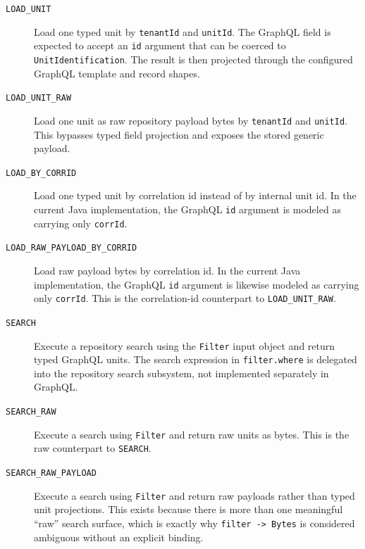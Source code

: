 \begin{description}
\item[\texttt{LOAD\_UNIT}] Load one typed unit by \texttt{tenantId} and \texttt{unitId}. The GraphQL field is expected to accept an \texttt{id} argument that can be coerced to \texttt{UnitIdentification}. The result is then projected through the configured GraphQL template and record shapes.

\vspace{.2cm}

\item[\texttt{LOAD\_UNIT\_RAW}] Load one unit as raw repository payload bytes by \texttt{tenantId} and \texttt{unitId}. This bypasses typed field projection and exposes the stored generic payload.

\vspace{.2cm}

\item[\texttt{LOAD\_BY\_CORRID}] Load one typed unit by correlation id instead of by internal unit id. In the current Java implementation, the GraphQL \texttt{id} argument is modeled as carrying only \texttt{corrId}.

\vspace{.2cm}

\item[\texttt{LOAD\_RAW\_PAYLOAD\_BY\_CORRID}] Load raw payload bytes by correlation id. In the current Java implementation, the GraphQL \texttt{id} argument is likewise modeled as carrying only \texttt{corrId}. This is the correlation-id counterpart to \texttt{LOAD\_UNIT\_RAW}.

\vspace{.2cm}

\item[\texttt{SEARCH}] Execute a repository search using the \texttt{Filter} input object and return typed GraphQL units. The search expression in \texttt{filter.where} is delegated into the repository search subsystem, not implemented separately in GraphQL.

\vspace{.2cm}

\item[\texttt{SEARCH\_RAW}] Execute a search using \texttt{Filter} and return raw units as bytes. This is the raw counterpart to \texttt{SEARCH}.

\vspace{.2cm}

\item[\texttt{SEARCH\_RAW\_PAYLOAD}] Execute a search using \texttt{Filter} and return raw payloads rather than typed unit projections. This exists because there is more than one meaningful ``raw'' search surface, which is exactly why \texttt{filter -> Bytes} is considered ambiguous without an explicit binding.


\end{description}
